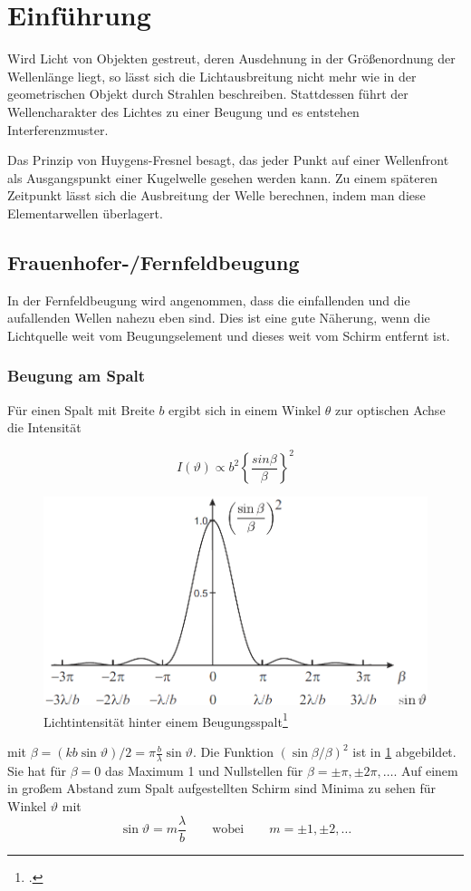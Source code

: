 \section{Einführung}
Wird Licht von Objekten gestreut, deren Ausdehnung in der Größenordnung der Wellenlänge liegt, so lässt sich die Lichtausbreitung nicht mehr wie in der geometrischen Objekt durch Strahlen beschreiben. Stattdessen führt der Wellencharakter des Lichtes zu einer Beugung und es entstehen Interferenzmuster.

Das Prinzip von Huygens-Fresnel besagt, das jeder Punkt auf einer Wellenfront als Ausgangspunkt einer Kugelwelle gesehen werden kann. Zu einem späteren Zeitpunkt lässt sich die Ausbreitung der Welle berechnen, indem man diese Elementarwellen überlagert.

\subsection{Frauenhofer-/Fernfeldbeugung}
In der Fernfeldbeugung wird angenommen, dass die einfallenden und die aufallenden Wellen nahezu eben sind. Dies ist eine gute Näherung, wenn die Lichtquelle weit vom Beugungselement und dieses weit vom Schirm entfernt ist.
\subsubsection{Beugung am Spalt}
Für einen Spalt mit Breite $b$ ergibt sich in einem Winkel $\theta$ zur optischen Achse die Intensität 

\begin{equation}
I(\vartheta)\propto b^2\left\{\frac{sin\beta}{\beta}\right\}^2
\label{spaltintens}
\end{equation}
\begin{figure}[!htb]
  \centering
  \includegraphics[width=.8\textwidth]{res/spaltintens}
  \caption{Lichtintensität hinter einem Beugungsspalt\footcite{anleitung-ss2015}}
  \label{fig:spaltintens}
\end{figure}
mit $\beta=(kb\sin\vartheta)/2=\pi\frac{b}{\lambda}\sin\vartheta$. Die Funktion $(\sin\beta/\beta)^2$ ist in \cref{fig:spaltintens} abgebildet. Sie hat für $\beta=0$ das Maximum 1 und Nullstellen für $\beta=\pm\pi, \pm 2\pi,\dots$. Auf einem in großem Abstand zum Spalt aufgestellten Schirm sind Minima zu sehen für Winkel $\vartheta$ mit 
\begin{equation}
\sin\vartheta=m\frac{\lambda}{b} \qquad\text{wobei}\qquad m=\pm1,\pm2,\dots
\label{spaltmin}
\end{equation}
